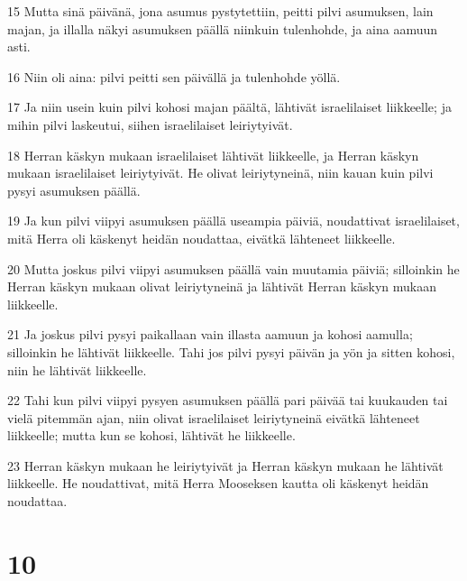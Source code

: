 \par 15 Mutta sinä päivänä, jona asumus pystytettiin, peitti pilvi asumuksen, lain majan, ja illalla näkyi asumuksen päällä niinkuin tulenhohde, ja aina aamuun asti.
\par 16 Niin oli aina: pilvi peitti sen päivällä ja tulenhohde yöllä.
\par 17 Ja niin usein kuin pilvi kohosi majan päältä, lähtivät israelilaiset liikkeelle; ja mihin pilvi laskeutui, siihen israelilaiset leiriytyivät.
\par 18 Herran käskyn mukaan israelilaiset lähtivät liikkeelle, ja Herran käskyn mukaan israelilaiset leiriytyivät. He olivat leiriytyneinä, niin kauan kuin pilvi pysyi asumuksen päällä.
\par 19 Ja kun pilvi viipyi asumuksen päällä useampia päiviä, noudattivat israelilaiset, mitä Herra oli käskenyt heidän noudattaa, eivätkä lähteneet liikkeelle.
\par 20 Mutta joskus pilvi viipyi asumuksen päällä vain muutamia päiviä; silloinkin he Herran käskyn mukaan olivat leiriytyneinä ja lähtivät Herran käskyn mukaan liikkeelle.
\par 21 Ja joskus pilvi pysyi paikallaan vain illasta aamuun ja kohosi aamulla; silloinkin he lähtivät liikkeelle. Tahi jos pilvi pysyi päivän ja yön ja sitten kohosi, niin he lähtivät liikkeelle.
\par 22 Tahi kun pilvi viipyi pysyen asumuksen päällä pari päivää tai kuukauden tai vielä pitemmän ajan, niin olivat israelilaiset leiriytyneinä eivätkä lähteneet liikkeelle; mutta kun se kohosi, lähtivät he liikkeelle.
\par 23 Herran käskyn mukaan he leiriytyivät ja Herran käskyn mukaan he lähtivät liikkeelle. He noudattivat, mitä Herra Mooseksen kautta oli käskenyt heidän noudattaa.

\chapter{10}

